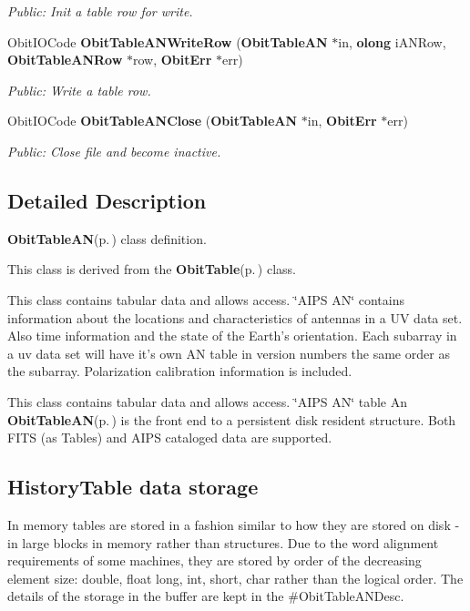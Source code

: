 \begin{CompactItemize}
\begin{CompactList}\small\item\em Public: Init a table row for write. \item\end{CompactList}\item 
Obit\-IOCode {\bf Obit\-Table\-ANWrite\-Row} ({\bf Obit\-Table\-AN} $\ast$in, {\bf olong} i\-ANRow, {\bf Obit\-Table\-ANRow} $\ast$row, {\bf Obit\-Err} $\ast$err)
\begin{CompactList}\small\item\em Public: Write a table row. \item\end{CompactList}\item 
Obit\-IOCode {\bf Obit\-Table\-ANClose} ({\bf Obit\-Table\-AN} $\ast$in, {\bf Obit\-Err} $\ast$err)
\begin{CompactList}\small\item\em Public: Close file and become inactive. \item\end{CompactList}\end{CompactItemize}


\subsection{Detailed Description}
{\bf Obit\-Table\-AN}{\rm (p.\,\pageref{structObitTableAN})} class definition. 

This class is derived from the {\bf Obit\-Table}{\rm (p.\,\pageref{structObitTable})} class.

This class contains tabular data and allows access. \char`\"{}AIPS AN\char`\"{} contains information about the locations and characteristics of antennas in a UV data set. Also time information and the state of the Earth's orientation. Each subarray in a uv data set will have it's own AN table in version numbers the same order as the subarray. Polarization calibration information is included.

This class contains tabular data and allows access. \char`\"{}AIPS AN\char`\"{} table An {\bf Obit\-Table\-AN}{\rm (p.\,\pageref{structObitTableAN})} is the front end to a persistent disk resident structure. Both FITS (as Tables) and AIPS cataloged data are supported.\subsection{History\-Table data storage}\label{ObitTableWX_8h_TableDataStorage}
In memory tables are stored in a fashion similar to how they are stored on disk - in large blocks in memory rather than structures. Due to the word alignment requirements of some machines, they are stored by order of the decreasing element size: double, float long, int, short, char rather than the logical order. The details of the storage in the buffer are kept in the \#Obit\-Table\-ANDesc.

